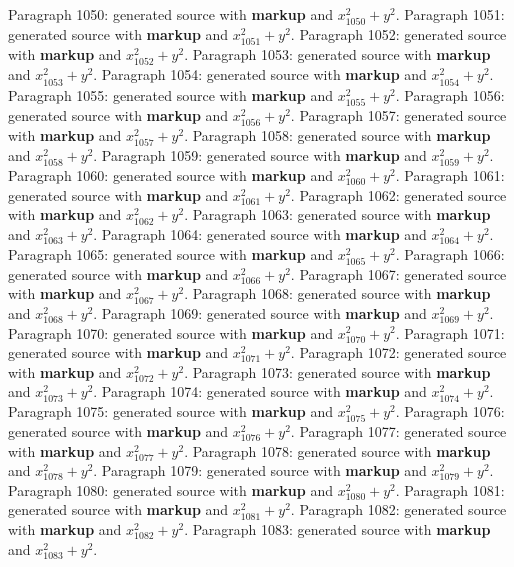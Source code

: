 \documentclass{article}
\begin{document}
Paragraph 1050: generated source with \textbf{markup} and $x_{1050}^2 + y^2$.
Paragraph 1051: generated source with \textbf{markup} and $x_{1051}^2 + y^2$.
Paragraph 1052: generated source with \textbf{markup} and $x_{1052}^2 + y^2$.
Paragraph 1053: generated source with \textbf{markup} and $x_{1053}^2 + y^2$.
Paragraph 1054: generated source with \textbf{markup} and $x_{1054}^2 + y^2$.
Paragraph 1055: generated source with \textbf{markup} and $x_{1055}^2 + y^2$.
Paragraph 1056: generated source with \textbf{markup} and $x_{1056}^2 + y^2$.
Paragraph 1057: generated source with \textbf{markup} and $x_{1057}^2 + y^2$.
Paragraph 1058: generated source with \textbf{markup} and $x_{1058}^2 + y^2$.
Paragraph 1059: generated source with \textbf{markup} and $x_{1059}^2 + y^2$.
Paragraph 1060: generated source with \textbf{markup} and $x_{1060}^2 + y^2$.
Paragraph 1061: generated source with \textbf{markup} and $x_{1061}^2 + y^2$.
Paragraph 1062: generated source with \textbf{markup} and $x_{1062}^2 + y^2$.
Paragraph 1063: generated source with \textbf{markup} and $x_{1063}^2 + y^2$.
Paragraph 1064: generated source with \textbf{markup} and $x_{1064}^2 + y^2$.
Paragraph 1065: generated source with \textbf{markup} and $x_{1065}^2 + y^2$.
Paragraph 1066: generated source with \textbf{markup} and $x_{1066}^2 + y^2$.
Paragraph 1067: generated source with \textbf{markup} and $x_{1067}^2 + y^2$.
Paragraph 1068: generated source with \textbf{markup} and $x_{1068}^2 + y^2$.
Paragraph 1069: generated source with \textbf{markup} and $x_{1069}^2 + y^2$.
Paragraph 1070: generated source with \textbf{markup} and $x_{1070}^2 + y^2$.
Paragraph 1071: generated source with \textbf{markup} and $x_{1071}^2 + y^2$.
Paragraph 1072: generated source with \textbf{markup} and $x_{1072}^2 + y^2$.
Paragraph 1073: generated source with \textbf{markup} and $x_{1073}^2 + y^2$.
Paragraph 1074: generated source with \textbf{markup} and $x_{1074}^2 + y^2$.
Paragraph 1075: generated source with \textbf{markup} and $x_{1075}^2 + y^2$.
Paragraph 1076: generated source with \textbf{markup} and $x_{1076}^2 + y^2$.
Paragraph 1077: generated source with \textbf{markup} and $x_{1077}^2 + y^2$.
Paragraph 1078: generated source with \textbf{markup} and $x_{1078}^2 + y^2$.
Paragraph 1079: generated source with \textbf{markup} and $x_{1079}^2 + y^2$.
Paragraph 1080: generated source with \textbf{markup} and $x_{1080}^2 + y^2$.
Paragraph 1081: generated source with \textbf{markup} and $x_{1081}^2 + y^2$.
Paragraph 1082: generated source with \textbf{markup} and $x_{1082}^2 + y^2$.
Paragraph 1083: generated source with \textbf{markup} and $x_{1083}^2 + y^2$.
\end{document}
